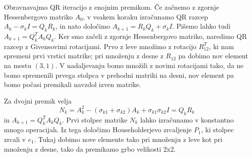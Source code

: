 
Obravnavajmo QR iteracijo z enojnim premikom.
Če začnemo z zgornje Hessenbergovo matriko $A_0$, v vsakem koraku izračunamo QR
razcep $A_k - \sigma_k I = Q_k R_k$, in nato določimo $A_{k+1} = R_k Q_k +
\sigma_k I$.
Pišemo lahko tudi $A_{k+1} = Q_k^T A_k Q_k$.
Ker smo začeli z zgornje Hessenbergovo matriko, naredimo QR razcep z
Givensovimi rotacijami.
Prvo z leve množimo z rotacijo $R_{12}^T$, ki nam spremeni prvi vrstici matrike;
pri množenju z desne z $R_{12}$ pa dobimo nov element na mestu $(3,1)$.
V nadaljevanju bomo množili z novimi rotacijami tako, da ne bomo spremenili
prvega stolpca v prehodni matriki na desni, nov element pa bomo počasi premikali
navzdol izven matrike.


Za dvojni premik velja
\[
  N_k = A_k^2 - (\sigma_{k1} + \sigma_{k2}) A_k + \sigma_{k1} \sigma_{k2} I =
  Q_k R_k
\]
in $A_{k+1} = Q_k^T A_k Q_k$.
Prvi stolpec matrike $N_k$ lahko izračunamo v konstantno mnogo operacijah.
Iz tega določimo Householderjevo zrcaljenje $P_1$, ki stolpec zrcali v $e_1$.
Tukaj dobimo nove elemente tako pri množenju z leve kot pri množenju z desne,
tako da premikamo grbo velikosti 2x2.


